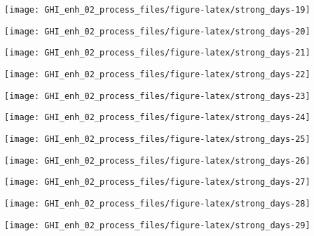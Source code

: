 \documentclass[
  10pt,
  a4paper,oneside]{article}
\begin{document}
\begin{center}\texttt{[image: GHI\_enh\_02\_process\_files/figure-latex/strong\_days-19]} \end{center}

\begin{center}\texttt{[image: GHI\_enh\_02\_process\_files/figure-latex/strong\_days-20]} \end{center}

\begin{center}\texttt{[image: GHI\_enh\_02\_process\_files/figure-latex/strong\_days-21]} \end{center}

\begin{center}\texttt{[image: GHI\_enh\_02\_process\_files/figure-latex/strong\_days-22]} \end{center}

\begin{center}\texttt{[image: GHI\_enh\_02\_process\_files/figure-latex/strong\_days-23]} \end{center}

\begin{center}\texttt{[image: GHI\_enh\_02\_process\_files/figure-latex/strong\_days-24]} \end{center}

\begin{center}\texttt{[image: GHI\_enh\_02\_process\_files/figure-latex/strong\_days-25]} \end{center}

\begin{center}\texttt{[image: GHI\_enh\_02\_process\_files/figure-latex/strong\_days-26]} \end{center}

\begin{center}\texttt{[image: GHI\_enh\_02\_process\_files/figure-latex/strong\_days-27]} \end{center}

\begin{center}\texttt{[image: GHI\_enh\_02\_process\_files/figure-latex/strong\_days-28]} \end{center}

\begin{center}\texttt{[image: GHI\_enh\_02\_process\_files/figure-latex/strong\_days-29]} \end{center}
\end{document}
